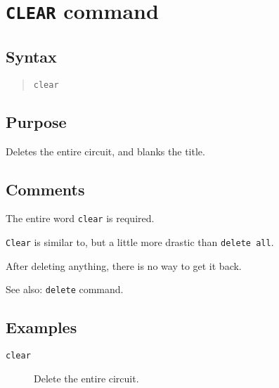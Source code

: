 %
%
%
%
\section{{\tt CLEAR} command}
\subsection{Syntax}
\begin{verse}
{\tt clear}
\end{verse}
\subsection{Purpose}

Deletes the entire circuit, and blanks the title.
\subsection{Comments}

The entire word {\tt clear} is required.

{\tt Clear} is similar to, but a little more drastic than {\tt delete all}.

After deleting anything, there is no way to get it back.

See also: {\tt delete} command.
\subsection{Examples}

\begin{description}

\item[{\tt clear}] Delete the entire circuit.

\end{description}
